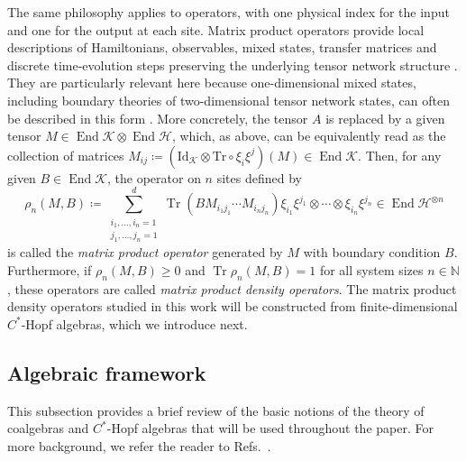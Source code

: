\documentclass[a4paper,10pt]{amsart}
\newcommand{\basisE}{\xi}
\newcommand{\newterm}[1]{\emph{#1}}
\theoremstyle{definition}
\begin{document}
The same philosophy applies to operators, with one physical index for the input and one for the output at each site. 
Matrix product operators provide local descriptions of Hamiltonians, observables, mixed states, transfer matrices and discrete time-evolution steps preserving the underlying tensor network structure \cite{verstraete_matrix_2008,pirvu_matrix_2010,cirac_unitaries_2017,cirac_matrix_2021}.
They are par\-ti\-cu\-lar\-ly relevant here because one-dimensional mixed states, including boundary theories of two-dimensional tensor network states, can often be described in this form \cite{zwolak_mixed-state_2004,cirac_matrix_2017,ruiz_matrix_2024}.
More concretely, the tensor $A$ is replaced by a given tensor $M \in \operatorname{End}\mathscr{K} \otimes \operatorname{End}\mathscr{H}$, which, as above, can be equivalently read as the collection of matrices $M_{ij} \coloneqq (\mathrm{Id}_{\mathscr{K}}\otimes \mathrm{Tr}\circ \basisE_i \basisE^j)(M) \in \operatorname{End}\mathscr{K}$.
Then, for any given $B\in \operatorname{End}\mathscr{K}$, the ope\-ra\-tor on $n$ sites defined by
\[
    \rho_{n}(M,B)
    \coloneqq
    \sum_{\substack{i_1,\ldots,i_n=1\\j_1,\ldots,j_n=1}}^{d}
        \operatorname{Tr}(B M_{i_1 j_1} \cdots M_{i_n j_n})
        \basisE_{i_1}\basisE^{j_1}\otimes \cdots\otimes \basisE_{i_n}\basisE^{j_n}
    \in \operatorname{End}\mathscr{H}^{\otimes n}
\]
is called the \newterm{matrix product operator} generated by $M$ with boundary condition $B$.
Furthermore, if $\rho_n(M,B)\geq 0$ and $\operatorname{Tr}\rho_n(M,B)=1$ for all system sizes $n\in\mathbb{N}$, these operators are called \newterm{matrix product density operators}.
The matrix product density operators studied in this work will be constructed from finite-dimensional $C^*$-Hopf algebras, which we introduce next.

\subsection{Algebraic framework}
\label{subsec:algebras}

This subsection provides a brief review of the basic notions of the theory of coalgebras and $C^*$-Hopf algebras that will be used throughout the paper.
For more background, we refer the reader to
Refs.~\cite{montgomery_representation_2001, montgomery_hopf_1993, bohm_weak_1999, etingof_fusion_2005, etingof_tensor_2015}.
\end{document}
